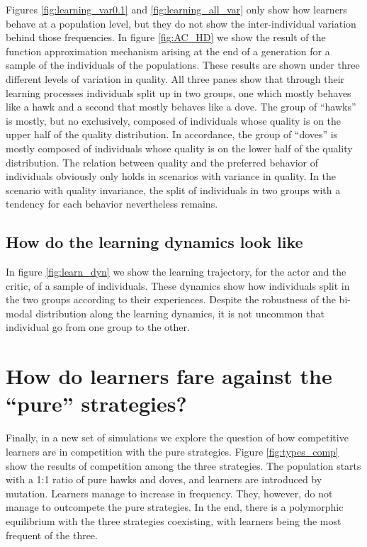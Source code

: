 \documentclass[
]{article}
\begin{document}
Figures \ref{fig:learning_var0.1} and \ref{fig:learning_all_var} only
show how learners behave at a population level, but they do not show the
inter-individual variation behind those frequencies. In figure
\ref{fig:AC_HD} we show the result of the function approximation
mechanism arising at the end of a generation for a sample of the
individuals of the populations. These results are shown under three
different levels of variation in quality. All three panes show that
through their learning processes individuals split up in two groups, one
which mostly behaves like a hawk and a second that mostly behaves like a
dove. The group of ``hawks'' is mostly, but no exclusively, composed of
individuals whose quality is on the upper half of the quality
distribution. In accordance, the group of ``doves'' is mostly composed
of individuals whose quality is on the lower half of the quality
distribution. The relation between quality and the preferred behavior of
individuals obviously only holds in scenarios with variance in quality.
In the scenario with quality invariance, the split of individuals in two
groups with a tendency for each behavior nevertheless remains.

\hypertarget{how-do-the-learning-dynamics-look-like}{%
\subsection{How do the learning dynamics look
like}\label{how-do-the-learning-dynamics-look-like}}

In figure \ref{fig:learn_dyn} we show the learning trajectory, for the
actor and the critic, of a sample of individuals. These dynamics show
how individuals split in the two groups according to their experiences.
Despite the robustness of the bi-modal distribution along the learning
dynamics, it is not uncommon that individual go from one group to the
other.

\hypertarget{how-do-learners-fare-against-the-pure-strategies}{%
\section{How do learners fare against the ``pure''
strategies?}\label{how-do-learners-fare-against-the-pure-strategies}}

Finally, in a new set of simulations we explore the question of how
competitive learners are in competition with the pure strategies. Figure
\ref{fig:types_comp} show the results of competition among the three
strategies. The population starts with a 1:1 ratio of pure hawks and
doves, and learners are introduced by mutation. Learners manage to
increase in frequency. They, however, do not manage to outcompete the
pure strategies. In the end, there is a polymorphic equilibrium with the
three strategies coexisting, with learners being the most frequent of
the three.
\end{document}
